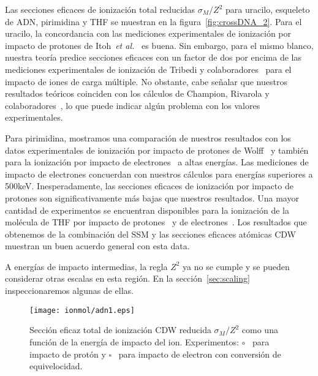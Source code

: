Las secciones eficaces de ionización total reducidas $\sigma_M/Z^2$ 
para uracilo, esqueleto de ADN, pirimidina y THF se muestran en la 
figura~\ref{fig:crossDNA_2}. Para el uracilo, la concordancia con las 
mediciones experimentales de ionización por impacto de protones de 
Itoh~\textit{et al.}~\cite{itoh2013} es buena. Sin embargo, para el 
mismo blanco, nuestra teoría predice secciones eficaces con un factor 
de dos por encima de las mediciones experimentales de ionización de 
Tribedi y colaboradores~\cite{agnihotri2012,agnihotri2013} para el 
impacto de iones de carga múltiple. No obstante, cabe señalar que 
nuestros resultados teóricos coinciden con los cálculos de Champion, 
Rivarola y colaboradores~\cite{agnihotri2012,champion2012}, lo que 
puede indicar algún problema con los valores experimentales.

Para pirimidina, mostramos una comparación de nuestros resultados con 
los datos experimentales de ionización por impacto de protones de 
Wolff~\cite{wolff2014} y también para la ionización por impacto de 
electrones~\cite{bug2017} a altas energías. Las mediciones de impacto 
de electrones concuerdan con nuestros cálculos para energías superiores 
a 500keV. Inesperadamente, las secciones eficaces de ionización por 
impacto de protones son significativamente más bajas que nuestros 
resultados. Una mayor cantidad de experimentos se encuentran disponibles 
para la ionización de la molécula de THF por impacto de 
protones~\cite{wang2016} y de electrones~\cite{bug2017,wolf2019,fuss2009}. 
Los resultados que obtenemos de la combinación del SSM y las secciones
eficaces atómicas CDW muestran un buen acuerdo general con esta data.

A energías de impacto intermedias, la regla $Z^2$ ya no se cumple y se 
pueden considerar otras escalas en esta región. En la 
sección~\ref{sec:scaling} inspeccionaremos algunas de ellas.


\begin{figure}
\centering
\texttt{[image: ionmol/adn1.eps]}
\caption[Sección eficaz total de ionización reducida por $Z$ (Parte I).]
{Sección eficaz total de ionización CDW reducida $\sigma_{M}/Z^2$ como 
una función de la energía de impacto del ion. Experimentos: 
\mbox{\Large$\circ$}~\cite{iriki2011,Bhattacharjee2019} para impacto de 
protón y $\square$~\cite{rahman2016} para impacto de electron con 
conversión de equivelocidad.}
\label{fig:crossDNA_1}
\end{figure} 

